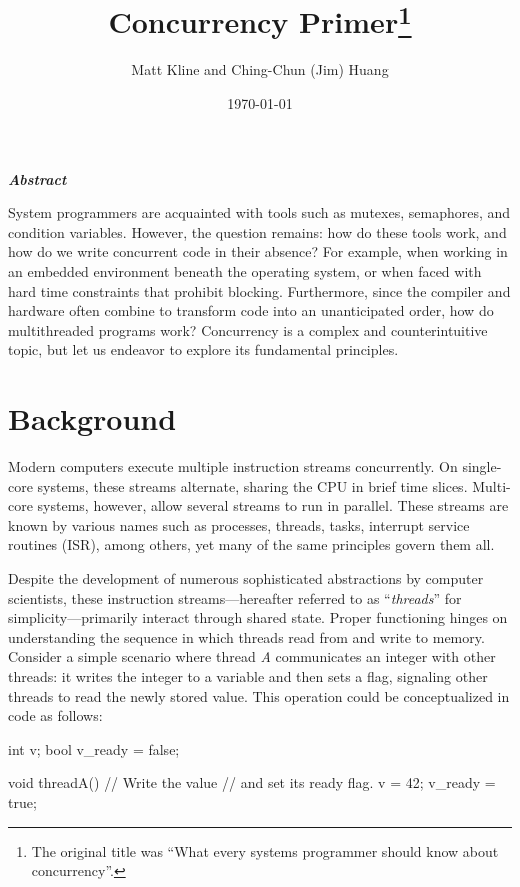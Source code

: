 \documentclass[fontsize=10pt, oneside]{scrartcl}
\title{Concurrency Primer\footnote{%
The original title was ``What every systems programmer should know about concurrency''.}
}
\author{Matt Kline and Ching-Chun (Jim) Huang}
\date{\today}
\makeatletter
\let\runauthor\@author
\let\rundate\@date
\let\runtitle\@title
\makeatother
\begin{document}
\begin{center}
\Large \runtitle
\bigskip

\large
\runauthor
\smallskip

\normalsize
\rundate
\end{center}
\bigskip

\begin{center}
\large \bfseries\itshape Abstract
\end{center}
\smallskip

\noindent
System programmers are acquainted with tools such as mutexes, semaphores, and condition variables.
However, the question remains: how do these tools work, and how do we write concurrent code in their absence?
For example, when working in an embedded environment beneath the operating system,
or when faced with hard time constraints that prohibit blocking.
Furthermore, since the compiler and hardware often combine to transform code into an unanticipated order,
how do multithreaded programs work? Concurrency is a complex and counterintuitive topic,
but let us endeavor to explore its fundamental principles.
\bigskip

\section{Background}
\label{background}

Modern computers execute multiple instruction streams concurrently.
On single-core systems, these streams alternate, sharing the \textsc{CPU} in brief time slices.
Multi-core systems, however, allow several streams to run in parallel.
These streams are known by various names such as processes, threads, tasks,
interrupt service routines (ISR), among others, yet many of the same principles govern them all.

Despite the development of numerous sophisticated abstractions by computer scientists,
these instruction streams—hereafter referred to as ``\emph{threads}'' for simplicity—primarily interact through shared state.
Proper functioning hinges on understanding the sequence in which threads read from and write to memory.
Consider a simple scenario where thread \textit{A} communicates an integer with other threads:
it writes the integer to a variable and then sets a flag, signaling other threads to read the newly stored value.
This operation could be conceptualized in code as follows:
\begin{ccode}
int v;
bool v_ready = false;

void threadA()
{
    // Write the value
    // and set its ready flag.
    v = 42;
    v_ready = true;
}
\end{ccode}
\end{document}
